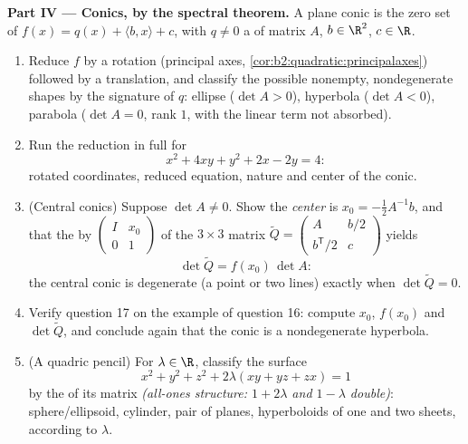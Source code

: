 \begin{problem}
\medskip
\noindent\textbf{Part IV --- Conics, by the spectral theorem.}
A plane conic is the zero set of $f(x) = q(x) + \langle b,
x\rangle + c$, with $q \neq 0$ a  of matrix $A$,
$b \in \R^2$, $c \in \R$.
\begin{enumerate}[resume]
  \item Reduce $f$ by a rotation (principal axes,
        \cref{cor:b2:quadratic:principalaxes}) followed by a
        translation, and classify the possible nonempty,
        nondegenerate shapes by the signature of $q$: ellipse
        ($\det A > 0$), hyperbola ($\det A < 0$), parabola
        ($\det A = 0$, rank $1$, with the linear term not
        absorbed).
  \item Run the reduction in full for
        \[
        x^2 + 4xy + y^2 + 2x - 2y = 4 :
        \]
        rotated coordinates, reduced equation, nature and
        center of the conic.
  \item (Central conics) Suppose $\det A \neq 0$. Show the
        \emph{center} is $x_0 = -\frac12 A^{-1}b$, and that the
         by $\begin{pmatrix} I & x_0\\ 0 &
        1\end{pmatrix}$ of the $3\times3$ matrix $\widetilde Q
        = \begin{pmatrix} A & b/2 \\ b^{\mathsf T}/2 &
        c\end{pmatrix}$ yields
        \[
        \det\widetilde Q = f(x_0)\,\det A :
        \]
        the central conic is degenerate (a point or two lines)
        exactly when $\det\widetilde Q = 0$.
  \item Verify question 17 on the example of question 16:
        compute $x_0$, $f(x_0)$ and $\det\widetilde Q$, and
        conclude again that the conic is a nondegenerate
        hyperbola.
  \item (A quadric pencil) For $\lambda \in \R$, classify the
        surface
        \[
        x^2 + y^2 + z^2 + 2\lambda(xy + yz + zx) = 1
        \]
        by the  of its matrix \emph{(all-ones
        structure:  $1 + 2\lambda$ and $1 -
        \lambda$ double)}: sphere/ellipsoid, cylinder, pair of
        planes, hyperboloids of one and two sheets, according
        to $\lambda$.
\end{enumerate}


\end{problem}
